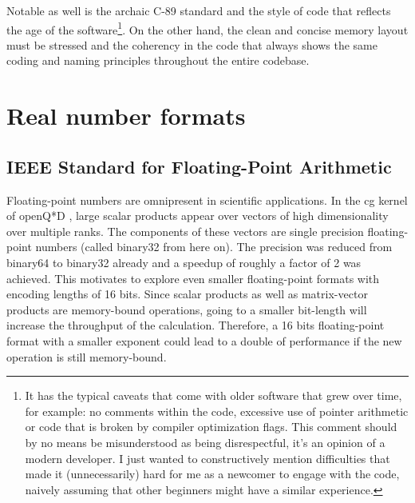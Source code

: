\documentclass{article}
\theoremstyle{plain} %
\theoremstyle{convention} %
\theoremstyle{remark} %
\numberwithin{equation}{section}
\begin{document}
Notable as well is the archaic C-89 standard and the style of code that reflects the age of the software\footnote{It has the typical caveats that come with older software that grew over time, for example: no comments within the code, excessive use of pointer arithmetic or code that is broken by compiler optimization flags. This comment should by no means be misunderstood as being disrespectful, it's an opinion of a modern developer. I just wanted to constructively mention difficulties that made it (unnecessarily) hard for me as a newcomer to engage with the code, naively assuming that other beginners might have a similar experience.


}. On the other hand, the clean and concise memory layout must be stressed and the coherency in the code that always shows the same coding and naming principles throughout the entire codebase.

\section{Real number formats}

\label{sec:floats}

\subsection{IEEE Standard for Floating-Point Arithmetic}

Floating-point numbers are omnipresent in scientific applications. In the \acrfull{cg} kernel of openQ*D \cite{openqxd}, large scalar products appear over vectors of high dimensionality over multiple ranks. The components of these vectors are single precision floating-point numbers (called \gls{binary32} from here on). The precision was reduced from \gls{binary64} to \gls{binary32} already and a speedup of roughly a factor of 2 was achieved. This motivates to explore even smaller floating-point formats with encoding lengths of 16 bits. Since scalar products as well as matrix-vector products are memory-bound operations, going to a smaller bit-length will increase the throughput of the calculation. Therefore, a 16 bits floating-point format with a smaller exponent could lead to a double of performance if the new operation is still memory-bound.
\end{document}
